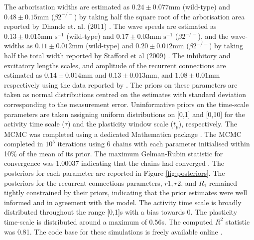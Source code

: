The arborisation widths are estimated as $0.24 \pm 0.077 \text{mm}$ (wild-type) and $0.48 \pm 0.15 \text{mm}$ ($\beta2^{-/-}$) by taking half the square root of the arborisation area reported by Dhande et. al. (2011) \cite{Dhande2011-jp}. The wave speeds are estimated as $0.13 \pm 0.015 \text{mm s}^{-1}$ (wild-type) and $0.17 \pm  0.03 \text{mm s}^{-1}$ ($\beta2^{-/-}$), and the wave-widths as $0.11 \pm 0.012 \text{mm}$ (wild-type) and $0.20 \pm 0.012 \text{mm}$ ($\beta2^{-/-}$) by taking half the total width reported by Stafford et al (2009) \cite{Stafford2009}. The inhibitory and excitatory lengths scales, and amplitude of the recurrent connections are estimated as $0.14 \pm 0.014 \text{mm}$ and $0.13 \pm 0.013 \text{mm}$, and $1.08 \pm 0.01 \text{mm}$ respectively using the data reported by \cite{Phongphanphanee2014-in}. The priors on these parameters are taken as normal distributions centred on the estimates with standard deviation corresponding to the measurement error. Uninformative priors on the time-scale parameters are taken assigning uniform distributions on [0,1] and [0,10] for the activity time scale ($\tau$) and the plasticity window scale ($t_p$), respectively. The MCMC was completed using a dedicated Mathematica package \cite{Burkart2017}. The MCMC completed in $10^5$ iterations using 6 chains with each parameter initialised within 10\% of the mean of its prior. The maximum Gelman-Rubin statistic for convergence was $1.00037$ indicating that the chains had converged \cite{Gelman1992-pk}. The posteriors for each parameter are reported in Figure \ref{fig:posteriors}. The posteriors for the recurrent connections parameters, $r1, r2$, and $R_1$ remained tightly constrained by their priors, indicating that the prior estimates were well informed and in agreement with the model. The activity time scale is broadly distributed throughout the range [0,1]s with a bias towards 0. The plasticity time-scale is distributed around a maximum of $0.56$s. The computed $R^2$ statistic was 0.81. The code base for these simulations is freely available online \cite{NFT}.
